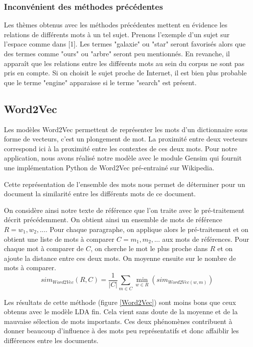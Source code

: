 \documentclass[12pt]{article}
\begin{document}
\subsubsection{Inconvénient des méthodes précédentes}
\noindent
Les thèmes obtenus avec les méthodes précédentes mettent en évidence les relations de différents mots à un tel sujet. Prenons l'exemple d'un sujet sur l'espace comme dans [1]. Les termes "galaxie" ou "star" seront favorisés alors que des termes comme "ours" ou "arbre" seront peu mentionnés. En revanche, il apparaît que les relations entre les différents mots au sein du corpus ne sont pas pris en compte. Si on choisit le sujet proche de Internet, il est bien plus probable que le terme "engine" apparaisse si le terme "search" est présent.

\subsection{Word2Vec}
\noindent
Les modèles Word2Vec permettent de représenter les mots d'un dictionnaire sous forme de vecteurs, c'est un plongement de mot. La proximité entre deux vecteurs correspond ici à la proximité entre les contextes de ces deux mots. Pour notre application, nous avons réalisé notre modèle avec le module Gensim qui fournit une implémentation Python de Word2Vec pré-entrainé sur Wikipedia.

\noindent
Cette représentation de l'ensemble des mots nous permet de déterminer pour un document la similarité entre les différents mots de ce document.

\noindent
On considère ainsi notre texte de référence que l'on traite avec le pré-traitement décrit précédemment. On obtient ainsi un ensemble de mots de référence $R = {w_1,w_2,...}$. Pour chaque paragraphe, on applique alors le pré-traitement et on obtient une liste de mots à comparer $ C = {m_1,m_2,...}$ aux mots de références. Pour chaque mot à comparer de $C$, on cherche le mot le plus proche dans $R$ et on ajoute la distance entre ces deux mots. On moyenne ensuite sur le nombre de mots à comparer.
\begin{equation}
sim_{Word2Vec}(R,C) = \frac{1}{|C|}\sum_{m \in C} \min_{w\in R}(sim_{Word2Vec(w,m)})
\end{equation}

\noindent
Les résultats de cette méthode (figure \ref{Word2Vec}) sont moins bons que ceux obtenus avec le modèle LDA fin. Cela vient sans doute de la moyenne et de la mauvaise sélection de mots importants. Ces deux phénomènes contribuent à donner beaucoup d'influence à des mots peu représentatifs et donc affaiblir les différences entre les documents.
\end{document}
